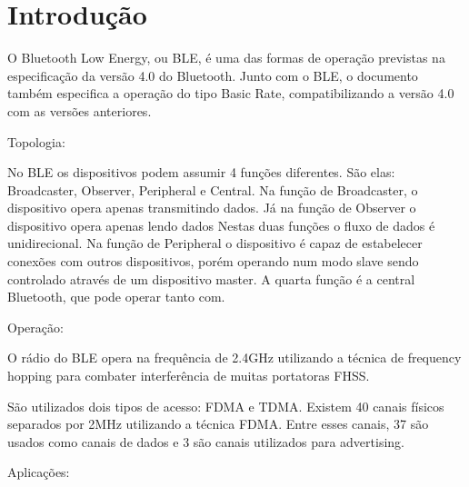 \section{Introdução}

O Bluetooth Low Energy, ou BLE, é uma das formas de operação previstas na especificação da versão 4.0 do Bluetooth. Junto com o BLE, o documento também especifica a operação do tipo Basic Rate, compatibilizando a versão 4.0 com as versões anteriores.	


Topologia:

No BLE os dispositivos podem assumir 4 funções diferentes. São elas: Broadcaster, Observer, Peripheral e Central.
Na função de Broadcaster, o dispositivo opera apenas transmitindo dados. Já na função de Observer o dispositivo opera apenas lendo dados Nestas duas funções o fluxo de dados é unidirecional.
Na função de Peripheral o dispositivo é capaz de estabelecer conexões com outros dispositivos, porém operando num modo slave sendo controlado através de um dispositivo master. A quarta função é a central Bluetooth, que pode operar tanto com.

Operação:

O rádio do BLE opera na frequência de 2.4GHz utilizando a técnica de frequency hopping para combater interferência de muitas portatoras FHSS.

São utilizados dois tipos de acesso: FDMA e TDMA. Existem 40 canais físicos separados por 2MHz utilizando a técnica FDMA. Entre esses canais, 37 são usados como canais de dados e 3 são canais utilizados para advertising.

Aplicações:


